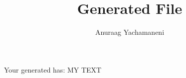 \documentclass[english]{article}
\begin{document}
 
\title{Generated File}
\author{Anuraag Yachamaneni}
\maketitle
Your generated has: MY TEXT 
\end{document}
